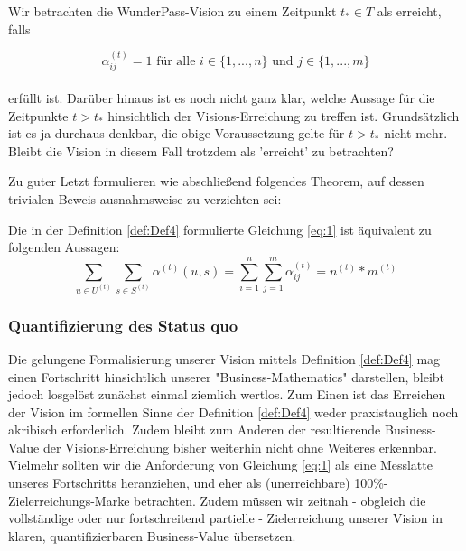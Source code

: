 \documentclass[11pt]{scrartcl}
\begin{document}
\begin{Def}\label{def:Def4}

Wir betrachten die WunderPass-Vision zu einem Zeitpunkt $t_{*} \in T$ als erreicht, falls

\vspace{0.3cm}

\begin{equation}
\label{eq:1}
  \alpha^{(t)}_{ij} = 1 \textrm{ für alle } i \in \{1,...,n\} \textrm{ und } j \in \{1,...,m\}
\end{equation}\\
erfüllt ist. Darüber hinaus ist es noch nicht ganz klar, welche Aussage für die Zeitpunkte $t > t_{*}$ hinsichtlich der Visions-Erreichung zu treffen ist. Grundsätzlich ist es ja durchaus denkbar, die obige Voraussetzung gelte für $t > t_{*}$ nicht mehr. Bleibt die Vision in diesem Fall trotzdem als 'erreicht' zu betrachten?

\end{Def}

\vspace{1cm}

Zu guter Letzt formulieren wie abschließend folgendes Theorem, auf dessen trivialen Beweis ausnahmsweise zu verzichten sei:

\vspace{0.3cm}

\begin{Theorem}
Die in der Definition \ref{def:Def4} formulierte Gleichung \eqref{eq:1} ist äquivalent zu folgenden Aussagen: 
\begin{equation*}
  \sum_{u \in U^{(t)}} \sum_{s \in S^{(t)}} \alpha^{(t)}(u, s) = \sum_{i=1}^n \sum_{j=1}^m \alpha^{(t)}_{ij} = n^{(t)} * m^{(t)}
\end{equation*}
\end{Theorem}

\subsubsection{Quantifizierung des Status quo}
\label{sec:eco_zahlen_status_quo}
Die gelungene Formalisierung unserer Vision mittels Definition \ref{def:Def4} mag einen Fortschritt hinsichtlich unserer "Business-Mathematics" darstellen, bleibt jedoch losgelöst zunächst einmal ziemlich wertlos. Zum Einen ist das Erreichen der Vision im formellen Sinne der Definition \ref{def:Def4} weder praxistauglich noch akribisch erforderlich. Zudem bleibt zum Anderen der resultierende Business-Value der Visions-Erreichung bisher weiterhin nicht ohne Weiteres erkennbar.
Vielmehr sollten wir die Anforderung von Gleichung \eqref{eq:1} als eine Messlatte unseres Fortschritts heranziehen, und eher als (unerreichbare) 100\%-Zielerreichungs-Marke betrachten. Zudem müssen wir zeitnah - obgleich die vollständige oder nur fortschreitend partielle - Zielerreichung unserer Vision in klaren, quantifizierbaren Business-Value übersetzen.
\end{document}
